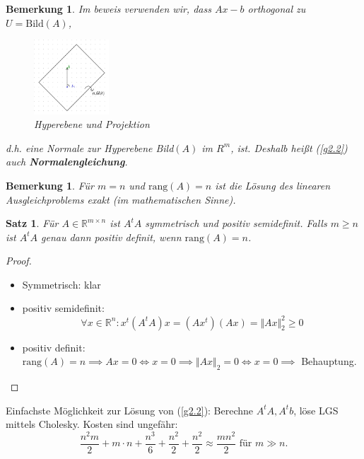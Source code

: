 \documentclass{book}
\newtheorem{theorem}[algorithm]{Satz}
\newtheorem{remark}[algorithm]{Bemerkung}
\def\R{\mathbb{R}}
\def\rang{\text{rang}}
\begin{document}
            \begin{remark}\label{b2.4}
                Im beweis verwenden wir, dass $Ax-b$ orthogonal zu $U=\text{Bild}(A)$,

                    \begin{figure}[H]
                        \centering
                        \includegraphics[width=0.25\textwidth]{Bild003}
                        \caption{Hyperebene und Projektion}
                    \end{figure}

                d.h. eine Normale zur Hyperebene Bild$(A)$ im $R^m$, ist. Deshalb heißt (\ref{g2.2}) auch \textbf{Normalengleichung}.
            \end{remark}

            \begin{remark}\label{b2.5}
                Für $m=n$ und $\rang(A)=n$ ist die Lösung des linearen Ausgleichproblems exakt (im mathematischen Sinne).
            \end{remark}

            \begin{theorem}\label{s2.6}
                Für $A\in\R^{m\times n}$ ist $A^tA$ symmetrisch und positiv semidefinit. Falls $m\geq n$ ist $A^tA$ genau 
                dann positiv definit, wenn $\rang(A)=n$.
            \end{theorem}
            \begin{proof}
                \begin{itemize}
                    \item Symmetrisch: klar
                    \item positiv semidefinit:
                    \[\forall x\in \R^n: x^t(A^tA)x=(Ax^t)(Ax)=\Vert Ax \Vert_2^2\geq 0\]
                    \item positiv definit: $\rang(A)=n\implies Ax=0\iff x=0\implies \Vert Ax \Vert_2=0\iff x=0\implies $ Behauptung.
                \end{itemize}
            \end{proof}
        
        Einfachste Möglichkeit zur Lösung von (\ref{g2.2}): Berechne $A^tA,A^tb$, löse LGS mittels Cholesky. Kosten sind ungefähr:
        \[\frac{n^2m}{2}+m\cdot n+\frac{n^3}{6}+\frac{n^2}{2}+\frac{n^2}{2}\approx\frac{mn^2}{2} \text{ für } m\gg n.\]
        
\end{document}
